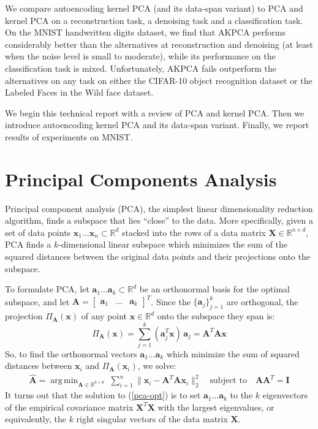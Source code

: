\documentclass[]{article}
\newcommand{\reals}{\mathbb{R}}
\DeclareMathOperator*{\argmin}{arg\,min}
\begin{document}
We compare autoencoding kernel PCA (and its data-span variant) to PCA and kernel PCA on a reconstruction task, a denoising task and a classification task.
On the MNIST handwritten digits dataset, we find that AKPCA performs considerably better than the alternatives at reconstruction and denoising (at least when the noise level is small to moderate), while its performance on the classification task is mixed.
Unfortunately, AKPCA fails outperform the alternatives on any task on either the CIFAR-10 object recognition dataset or the Labeled Faces in the Wild face dataset.

We begin this technical report with a review of PCA and kernel PCA.
Then we introduce autoencoding kernel PCA and its data-span variant.
Finally, we report results of experiments on MNIST.

\section{Principal Components Analysis}

Principal component analysis (PCA), the simplest linear dimensionality reduction algorithm, finds a subspace that lies ``close'' to the data.
More specifically, given a set of data points $\mathbf{x}_1 \hdots \mathbf{x}_n \subset \reals^d$ stacked into the rows of a data matrix $\mathbf{X} \in \reals^{n\times d}$, PCA finds a $k$-dimensional linear subspace which minimizes the sum of the squared distances between the original data points and their projections onto the subspace.

To formulate PCA, let $\mathbf{a}_1 \hdots \mathbf{a}_k \subset \reals^d$ be an orthonormal basis for the optimal subspace, and let $\mathbf{A} = \begin{bmatrix} \mathbf{a}_1 & \hdots & \mathbf{a}_k \end{bmatrix}^T$.
Since the $\{\mathbf{a}_j\}_{j=1}^k$ are orthogonal, the projection $\Pi_{\mathbf{A}}(\mathbf{x})$ of any point $\mathbf{x} \in \reals^d$ onto the subspace they span is:
$$ \Pi_{\mathbf{A}}(\mathbf{x}) = \sum_{j=1}^k (\mathbf{a}_j ^T \mathbf{x}) \, \mathbf{a}_j = \mathbf{A}^T \mathbf{A} \mathbf{x}$$
So, to find the orthonormal vectors $\mathbf{a}_1 \hdots \mathbf{a}_k$ which minimize the sum of squared distances between $\mathbf{x}_i$ and $\Pi_{\mathbf{A}}(\mathbf{x}_i)$, we solve:
\begin{align}
\label{pca-opt}
\hat{\mathbf{A}} = \argmin_{\mathbf{A} \in \reals^{k \times d}} \; \sum_{i=1}^n \| \mathbf{x}_i - \mathbf{A}^T \mathbf{A} \mathbf{x}_i  \|_2^2 \quad \text{subject to} \quad \mathbf{A} \mathbf{A}^T = \mathbf{I}
\end{align}
It turns out that the solution to (\ref{pca-opt}) is to set $\mathbf{a}_1 \hdots \mathbf{a}_k$ to the $k$ eigenvectors of the empirical covariance matrix $\mathbf{X}^T \mathbf{X}$ with the largest eigenvalues, or equivalently, the $k$ right singular vectors of the data matrix $\mathbf{X}$.
\end{document}
